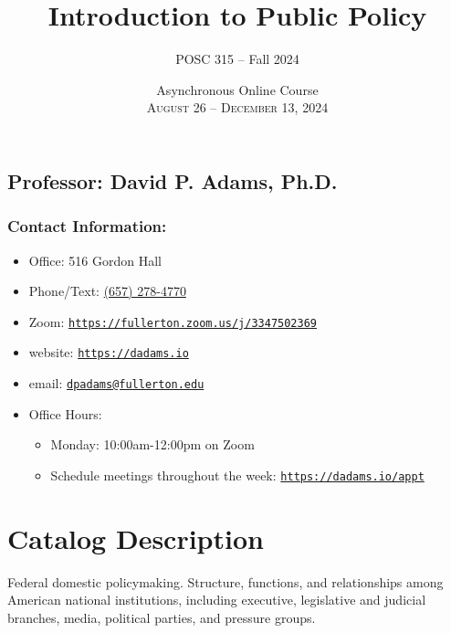 \documentclass[12pt, letterpaper]{article}
\begin{document}
\title{\textbf{Introduction to Public Policy}}

\author{POSC 315 -- Fall 2024}
\date{Asynchronous Online Course \\ \textsc{August 26 -- December 13, 2024}}

    \maketitle


\subsection*{Professor: David P. Adams, Ph.D.}

\subsubsection*{Contact Information:}

\begin{itemize}
	\item Office: 516 Gordon Hall
	\item Phone/Text: \href{tel:+16572784770}{(657) 278-4770}
	\item Zoom: \href{https://fullerton.zoom.us/j/3347502369}{\texttt{https://fullerton.zoom.us/j/3347502369}}
	\item website: \href{https://dadams.io}{\texttt{https://dadams.io}}
	\item email: \href{dpadams@fullerton.edu}{\texttt{dpadams@fullerton.edu}}
	\item Office Hours:
        \begin{itemize}
            \item Monday: 10:00am-12:00pm on Zoom
            \item Schedule meetings throughout the week: \href{https://dadams.io/appt}{\texttt{https://dadams.io/appt}}
        \end{itemize}  
\end{itemize}


\section*{Catalog Description}

	Federal domestic policymaking. Structure, functions, and relationships among American national institutions, including executive, legislative and judicial branches, media, political parties, and pressure groups.
\end{document}
